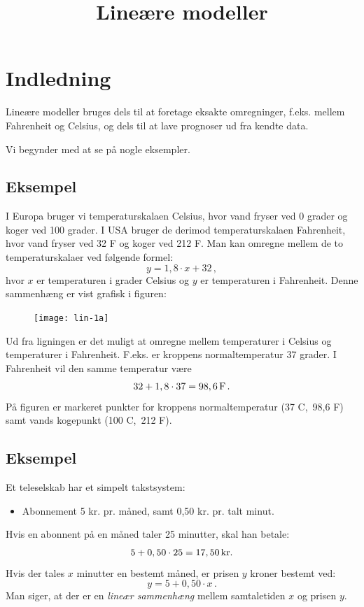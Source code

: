\documentclass[12pt,oneside,a4paper]{article}
\title{Lineære modeller}
\date{\vspace{-5ex}}
\begin{document}
\maketitle


\section{Indledning}
Lineære modeller bruges dels til at foretage eksakte omregninger, f.eks. mellem
Fahrenheit og Celsius, og dels til at lave prognoser ud fra kendte data.

Vi begynder med at se på nogle eksempler.

\subsection{Eksempel}
I Europa bruger vi temperaturskalaen Celsius, hvor vand fryser ved 0 grader og
koger ved 100 grader.  I USA bruger de derimod temperaturskalaen Fahrenheit,
hvor vand fryser ved 32 F og koger ved 212 F.
Man kan omregne mellem de to temperaturskalaer ved følgende formel:
\[
    y = 1,8\cdot x  + 32 \,,
\]
hvor $x$ er temperaturen i grader Celsius og $y$ er temperaturen i Fahrenheit.
Denne sammenhæng er vist grafisk i figuren:

\begin{figure}[H]
    \centering
    \texttt{[image: lin-1a]}
\end{figure}

Ud fra ligningen er det muligt at omregne mellem temperaturer i Celsius og
temperaturer i Fahrenheit. F.eks.  er kroppens normaltemperatur 37 grader. I
Fahrenheit vil den samme temperatur være
\[
    32 + 1,8\cdot 37 = 98,6\, {\rm F} \,.
\]
På figuren er markeret punkter for kroppens normaltemperatur (37 C,\, 98,6 F) samt
vands kogepunkt (100 C,\, 212 F).

\subsection{Eksempel}
Et teleselskab har et simpelt takstsystem:
\begin{itemize}
    \item Abonnement 5 kr. pr. måned, samt 0,50 kr. pr. talt minut.
\end{itemize}
Hvis en abonnent på en måned taler 25 minutter, skal han betale:
$$
5 + 0,50\cdot25 = 17,50 \, {\rm kr}.
$$
Hvis der tales $x$ minutter en bestemt måned, er prisen $y$ kroner bestemt ved:
$$
y = 5 + 0,50\cdot x \,.
$$
Man siger, at der er en {\em lineær sammenhæng} mellem samtaletiden $x$ og prisen $y$.
\end{document}
